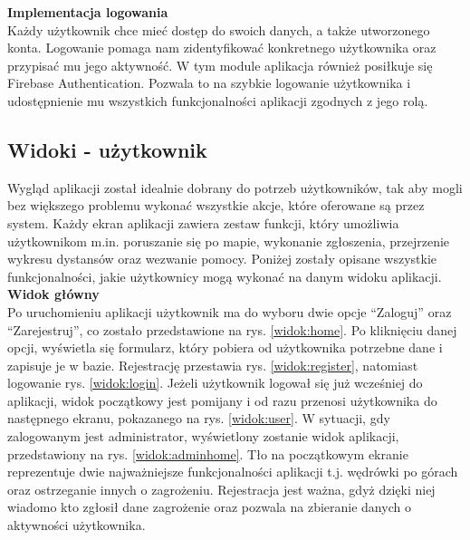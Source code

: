 \noindent
\textbf{Implementacja logowania}\\
\indent Każdy użytkownik chce mieć dostęp do swoich danych, a także utworzonego konta. Logowanie pomaga nam zidentyfikować konkretnego użytkownika oraz przypisać mu jego aktywność. W tym module aplikacja również posiłkuje się Firebase Authentication. Pozwala to na szybkie logowanie użytkownika i udostępnienie mu wszystkich funkcjonalności aplikacji zgodnych z jego rolą.\\
\noindent
\setlength{\fboxrule}{0.5pt}
\begin{minipage}{\linewidth}
    \label{lst:login}
    \centering
\end{minipage}


\subsection{Widoki - użytkownik}
Wygląd aplikacji został idealnie dobrany do potrzeb użytkowników, tak aby mogli bez większego problemu wykonać wszystkie akcje, które oferowane są przez system. Każdy ekran aplikacji zawiera zestaw funkcji, który umożliwia użytkownikom m.in. poruszanie się po mapie, wykonanie zgłoszenia, przejrzenie wykresu dystansów oraz wezwanie pomocy. Poniżej zostały opisane wszystkie funkcjonalności, jakie użytkownicy mogą wykonać na danym widoku aplikacji.
\\

\noindent
\textbf{Widok główny}\\
\indent Po uruchomieniu aplikacji użytkownik ma do wyboru dwie opcje “Zaloguj” oraz “Zarejestruj”, co zostało przedstawione na rys. \ref{widok:home}. Po kliknięciu danej opcji, wyświetla się formularz, który pobiera od użytkownika potrzebne dane i zapisuje je w bazie. Rejestrację przestawia rys. \ref{widok:register}, natomiast logowanie rys. \ref{widok:login}. Jeżeli użytkownik logował się już wcześniej do aplikacji, widok początkowy jest pomijany i od razu przenosi użytkownika do następnego ekranu, pokazanego na rys. \ref{widok:user}. W sytuacji, gdy zalogowanym jest administrator, wyświetlony zostanie widok aplikacji, przedstawiony na rys. \ref{widok:adminhome}. Tło na początkowym ekranie reprezentuje dwie najważniejsze funkcjonalności aplikacji t.j. wędrówki po górach oraz ostrzeganie innych o zagrożeniu. Rejestracja jest ważna, gdyż dzięki niej wiadomo kto zgłosił dane zagrożenie oraz pozwala na zbieranie danych o aktywności użytkownika.\\

